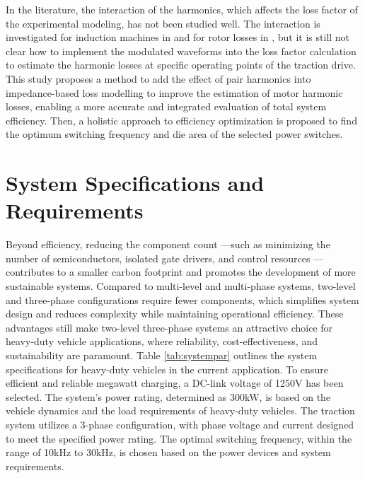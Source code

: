 \documentclass[conference]{IPEC2026}
\begin{document}

In the literature, the interaction of the harmonics, which affects the loss factor of the experimental modeling, has not been studied well. 
The interaction is investigated for induction machines in \cite{interaction_harmonics} and for rotor losses in \cite{rotor_losses_1,rotor_losses_2}, but it is still not clear how to implement the modulated waveforms into the loss factor calculation to estimate the harmonic losses at specific operating points of the traction drive. 
This study proposes a method to add the effect of pair harmonics into impedance-based loss modelling to improve the estimation of motor harmonic losses, enabling a more accurate and integrated evaluation of total system efficiency. 
Then, a holistic approach to efficiency optimization is proposed to find the optimum switching frequency and die area of the selected power switches. 



\section{System Specifications and Requirements}
Beyond efficiency, reducing the component count —such as minimizing the number of semiconductors, isolated gate drivers, and control resources —contributes to a smaller carbon footprint and promotes the development of more sustainable systems.
Compared to multi-level and multi-phase systems, two-level and three-phase configurations require fewer components, which simplifies system design and reduces complexity while maintaining operational efficiency. 
These advantages still make two-level three-phase systems an attractive choice for heavy-duty vehicle applications, where reliability, cost-effectiveness, and sustainability are paramount.
Table \ref{tab:systempar} outlines the system specifications for heavy-duty vehicles in the current application.
To ensure efficient and reliable megawatt charging, a DC-link voltage of 1250V has been selected.
The system's power rating, determined as 300kW, is based on the vehicle dynamics and the load requirements of heavy-duty vehicles.
The traction system utilizes a 3-phase configuration, with phase voltage and current designed to meet the specified power rating.
The optimal switching frequency, within the range of 10kHz to 30kHz, is chosen based on the power devices and system requirements.
\end{document}
